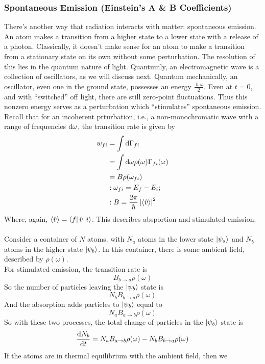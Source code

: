 \documentclass[a4paper]{article}
\begin{document}
\subsubsection{Spontaneous Emission (Einstein's A \& B Coefficients)}
There's another way that radiation interacts with matter: spontaneous emission.
An atom makes a transition from a higher state to a lower state with a release
of a photon. Classically, it doesn't make sense for an atom to make a 
transition from a stationary state on its own without some perturbation. The
resolution of this lies in the quantum nature of light. Quantumly, an
electromagnetic wave is a collection of oscillators, as we will discuss next.
Quantum mechanically, an oscillator, even one in the ground state, possesses
an energy $\frac{\hslash\omega}{2}$. Even at $t=0$, and with ``switched'' off
light, there are still zero-point fluctuations. Thus this nonzero energy
serves as a perturbation which ``stimulates'' spontaneous emission.\\
Recall that for an incoherent prturbation, i.e., a non-monochromatic wave with
a range of frequencies $\mathrm{d}\omega$, the transition rate is given by
\begin{align*}
	w_{fi} &= \int \mathrm{d}\Gamma_{fi}\\
		    &= \int \mathrm{d}\omega \rho(\omega) \Gamma_{fi}(\omega)\\
		    &= B\rho(\omega_{fi})\\
		    &: \omega_{fi} = E_f-E_i;\\
		    &:B = \frac{2\pi}{\hslash}\left\lvert \left\langle \hat{v}\right\rangle\right\rvert^2
\end{align*}
Where, again, \( \left\langle \hat{v}\right\rangle = \left\langle f \right\rvert\hat{v}\left\lvert i\right\rangle \).
This describes absportion and stimulated emission.\\~\\
Consider a container of $N$ atoms. with $N_a$ atoms in the lower state
$\left\lvert \psi_a\right\rangle$ and $N_b$ atoms in the higher state $\left\lvert \psi_b\right\rangle$. In this
container, there is some ambient field, described by $\rho(\omega)$.\\
For stimulated emission, the transition rate is
\[
	B_{b\to a}\rho(\omega)
\]
So the number of particles leaving the $\left\lvert \psi_b\right\rangle$ state is
\[
	N_bB_{b\to a}\rho(\omega)
\]
And the absorption adds particles to $\left\lvert \psi_b\right\rangle$ equal to
\[
	N_aB_{a\to b}\rho(\omega)
\]
So with these two processes, the total change of particles in the
$\left\lvert \psi_b\right\rangle$ state is
\[
	\frac{\mathrm{d} N_b}{\mathrm{d} t} = N_aB_{a\to b}\rho(\omega) -
			N_bB_{b\to a}\rho(\omega)
\]
If the atoms are in thermal equilibrium with the ambient field, then we
\end{document}
